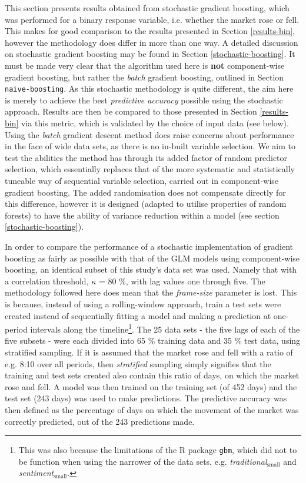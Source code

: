 \documentclass{article}
\begin{document}
This section presents results obtained from stochastic gradient boosting, which was performed for a binary response variable, i.e. whether the market rose or fell. This makes for good comparison to the results presented in Section \ref{results-bin}, however the methodology does differ in more than one way. A detailed discussion on stochastic gradient boosting may be found in Section \ref{stochastic-boosting}. It must be made very clear that the algorithm used here is \textbf{not} component-wise gradient boosting, but rather the \emph{batch} gradient boosting, outlined in Section \texttt{naive-boosting}. As this stochastic methodology is quite different, the aim here is merely to achieve the best \emph{predictive accuracy} possible using the stochastic approach. Results are then be compared to those presented in Section \ref{results-bin} via this metric, which is validated by the choice of input data (see below). Using the \emph{batch} gradient descent method does raise concerns about performance in the face of wide data sets, as there is no in-built variable selection. We aim to test the abilities the method has through its added factor of random predictor selection, which essentially replaces that of the more systematic and statistically tuneable way of sequential variable selection, carried out in component-wise gradient boosting. The added randomisation does not compensate directly for this difference, however it is designed (adapted to utilise properties of random forests) to have the ability of variance reduction within a model (see section \ref{stochastic-boosting}).

In order to compare the performance of a stochastic implementation of gradient boosting as fairly as possible with that of the GLM models using component-wise boosting, an identical subset of this study's data set was used. Namely that with a correlation threshold, $\kappa$ = 80 \%, with lag values one through five. The methodology followed here does mean that the \emph{frame-size} parameter is lost. This is because, instead of using a rolling-window approach, train a test sets were created instead of sequentially fitting a model and making a prediction at one-period intervals along the timeline\footnote{This was also because the limitations of the R package \texttt{gbm}, which did not to be function when using the narrower of the data sets, e.g. \emph{traditional$_{\text{small}}$} and \emph{sentiment$_{\text{small}}$}.}. The 25 data sets - the five lags of each of the five subsets - were each divided into 65 \% training data and 35 \% test data, using stratified sampling. If it is assumed that the market rose and fell with a ratio of e.g. 8:10 over all periods, then \emph{stratified} sampling simply signifies that the training and test sets created also contain this ratio of days, on which the market rose and fell. A model was then trained on the training set (of 452 days) and the test set (243 days) was used to make predictions. The predictive accuracy was then defined as the percentage of days on which the movement of the market was correctly predicted, out of the 243 predictions made.
\end{document}
